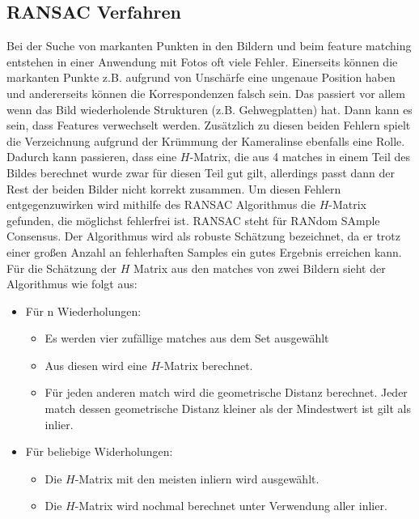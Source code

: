 \subsection{RANSAC Verfahren}
Bei der Suche von markanten Punkten in den Bildern und beim feature matching entstehen in einer Anwendung mit Fotos oft viele Fehler. Einerseits können die markanten Punkte z.B. aufgrund von Unschärfe eine ungenaue Position haben und andererseits können die Korrespondenzen falsch sein. Das passiert vor allem wenn das Bild wiederholende Strukturen (z.B. Gehwegplatten) hat. Dann kann es sein, dass Features verwechselt werden. Zusätzlich zu diesen beiden Fehlern spielt die Verzeichnung aufgrund der Krümmung der Kameralinse ebenfalls eine Rolle. Dadurch kann passieren, dass eine $H$-Matrix, die aus 4 matches in einem Teil des Bildes berechnet wurde zwar für diesen Teil gut gilt, allerdings passt dann der Rest der beiden Bilder nicht korrekt zusammen.
Um diesen Fehlern entgegenzuwirken wird mithilfe des RANSAC Algorithmus die $H$-Matrix gefunden, die möglichst fehlerfrei ist. RANSAC steht für RANdom SAmple Consensus. Der Algorithmus wird als robuste Schätzung bezeichnet, da er trotz einer großen Anzahl an fehlerhaften Samples ein gutes Ergebnis erreichen kann. Für die Schätzung der $H$ Matrix aus den matches von zwei Bildern sieht der Algorithmus wie folgt aus:

\begin{itemize}
    \item Für n Wiederholungen:

    \begin{itemize}
        \item Es werden vier zufällige matches aus dem Set ausgewählt
        \item Aus diesen wird eine $H$-Matrix berechnet.
        \item Für jeden anderen match wird die geometrische Distanz berechnet. Jeder match dessen geometrische Distanz kleiner als der Mindestwert ist gilt als inlier.
    \end{itemize}
    
    \item Für beliebige Widerholungen:
    
    \begin{itemize}
        \item Die $H$-Matrix mit den meisten inliern wird ausgewählt.
        \item Die $H$-Matrix wird nochmal berechnet unter Verwendung aller inlier.
    \end{itemize}
    
\end{itemize}


